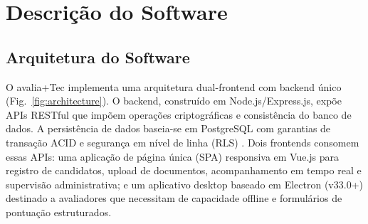 \documentclass[preprint,12pt,a4paper]{elsarticle}
\begin{document}
\section{Descrição do Software}

\subsection{Arquitetura do Software}

O avalia+Tec implementa uma arquitetura dual-frontend com backend único (Fig.~\ref{fig:architecture}). O backend, construído em Node.js/Express.js, expõe APIs RESTful que impõem operações criptográficas e consistência do banco de dados. A persistência de dados baseia-se em PostgreSQL com garantias de transação ACID e segurança em nível de linha (RLS) \citep{ISO27001}. Dois frontends consomem essas APIs: uma aplicação de página única (SPA) responsiva em Vue.js para registro de candidatos, upload de documentos, acompanhamento em tempo real e supervisão administrativa; e um aplicativo desktop baseado em Electron (v33.0+) destinado a avaliadores que necessitam de capacidade offline e formulários de pontuação estruturados.
\end{document}
